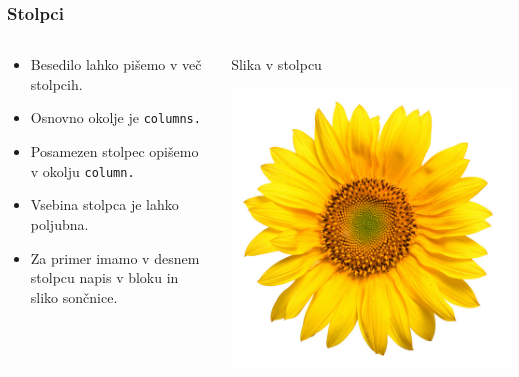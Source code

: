 \documentclass{beamer}
\begin{document}
\begin{frame}
	\frametitle{Stolpci}
	\begin{columns}
		\begin{column}{0.5 \textwidth}
		\begin{itemize}
\item
            Besedilo lahko pišemo v več stolpcih.
            \item
            Osnovno okolje je \texttt{columns.}
            \item
            Posamezen stolpec opišemo v okolju \texttt{column.}
            \item
            Vsebina stolpca je lahko poljubna.
            \item
            Za primer imamo v desnem stolpcu napis v bloku in sliko sončnice.
            	\end{itemize}
		\end{column}
		
		\begin{column}{0.5 \textwidth}
		\begin{exampleblock}{}
		\centering
Slika v stolpcu
		\end{exampleblock}
		\includegraphics{soncnica.jpg}
		\end{column}
\end{columns}

\end{frame}
\end{document}
